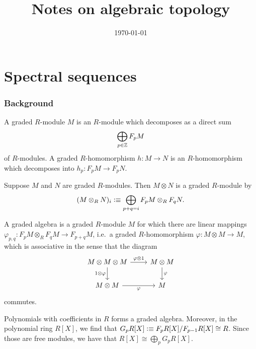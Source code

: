 \documentclass{article}
\title{Notes on algebraic topology}
\date{\today}
\begin{document}
\maketitle

\tableofcontents

\part{Spectral sequences}
\section{Background}
\begin{defn}
A graded $R$-module $M$ is an $R$-module which decomposes as a direct
sum
\begin{equation*}
\bigoplus_{p\in\mathbb{Z}} F_p M
\end{equation*}
of $R$-modules. A graded $R$-homomorphism $h:M\to N$ is an $R$-homomorphism which
decomposes into $h_p:F_pM\to F_pN$. 
\end{defn}

\begin{lem}
Suppose $M$ and $N$ are graded $R$-modules. Then $M\otimes N$ is a graded
$R$-module by
\begin{equation*}
(M\otimes_R N)_i\vcentcolon\equiv \bigoplus_{p+q=i} F_pM\otimes_R F_qN.
\end{equation*}
\end{lem}

\begin{defn}
A graded algebra is a graded $R$-module $M$ for which there are linear mappings
$\varphi_{p,q}:F_pM\otimes_R F_qM\to F_{p+q}M$, i.e.~a graded $R$-homomorphism
$\varphi:M\otimes M\to M$, which is associative in the sense
that the diagram
\begin{equation*}
\begin{tikzcd}
M\otimes M\otimes M \arrow[r,"\varphi\otimes 1"] \arrow[d,swap,"1\otimes\varphi"] &
M\otimes M \arrow[d,"\varphi"] \\ M\otimes M \arrow[r,swap,"\varphi"] & M
\end{tikzcd}
\end{equation*}
commutes.
\end{defn}

\begin{eg}
Polynomials with coefficients in $R$ forms a graded algebra. Moreover, in the
polynomial ring $R[X]$, we find that $G_pR[X]\vcentcolon\equiv F_pR[X]/F_{p-1}R[X]\cong R$.
Since those are free modules, we have that $R[X]\cong \bigoplus_p G_pR[X]$. 
\end{eg}
\end{document}
